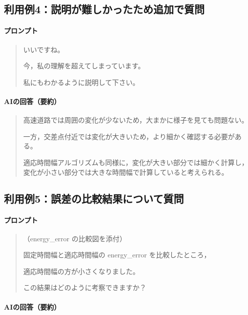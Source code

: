 \documentclass[uplatex,dvipdfmx]{jsarticle}
\begin{document}
\subsection*{利用例4：説明が難しかったため追加で質問}

\paragraph{プロンプト}

\begin{quote}
いいですね。

今，私の理解を超えてしまっています。

私にもわかるように説明して下さい。
\end{quote}

\paragraph{AIの回答（要約）}

\begin{quote}
高速道路では周囲の変化が少ないため，大まかに様子を見ても問題ない。

一方，交差点付近では変化が大きいため，より細かく確認する必要がある。

適応時間幅アルゴリズムも同様に，変化が大きい部分では細かく計算し，変化が小さい部分では大きな時間幅で計算していると考えられる。
\end{quote}

\subsection*{利用例5：誤差の比較結果について質問}

\paragraph{プロンプト}

\begin{quote}
（energy\_error の比較図を添付）

固定時間幅と適応時間幅の energy\_error を比較したところ，

適応時間幅の方が小さくなりました。

この結果はどのように考察できますか？
\end{quote}

\paragraph{AIの回答（要約）}
\end{document}
